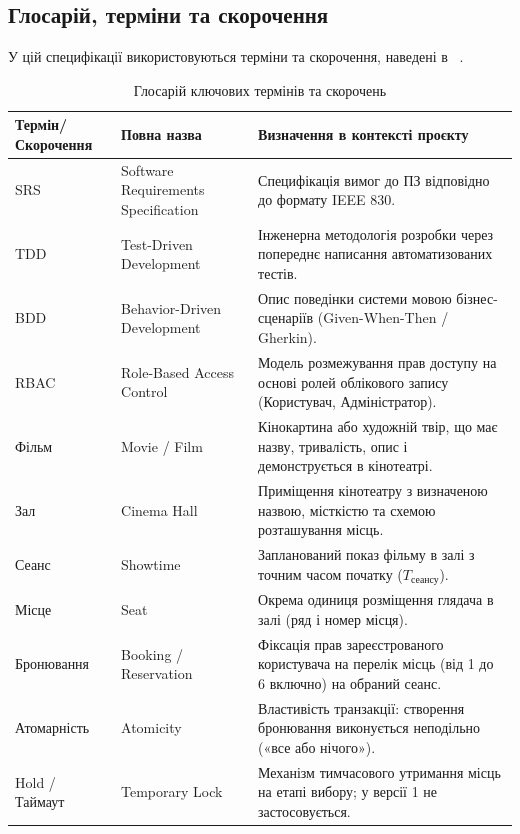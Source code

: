 \subsection{Глосарій, терміни та скорочення}\label{sec:vstup-hlosarii}
У цій специфікації використовуються терміни та скорочення, наведені в ~.

\begin{table}[htbp]
\caption{Глосарій ключових термінів та скорочень}\label{tab:glossary}
\centering
\begin{tabularx}{\textwidth}{@{}l l L@{}}
\toprule
\textbf{Термін/Скорочення} & \textbf{Повна назва} & \textbf{Визначення в контексті проєкту} \\
\midrule
SRS & Software Requirements Specification & Специфікація вимог до ПЗ відповідно до формату IEEE 830. \\
TDD & Test-Driven Development & Інженерна методологія розробки через попереднє написання автоматизованих тестів. \\
BDD & Behavior-Driven Development & Опис поведінки системи мовою бізнес-сценаріїв (Given-When-Then / Gherkin). \\
RBAC & Role-Based Access Control & Модель розмежування прав доступу на основі ролей облікового запису (Користувач, Адміністратор). \\
Фільм & Movie / Film & Кінокартина або художній твір, що має назву, тривалість, опис і демонструється в кінотеатрі. \\
Зал & Cinema Hall & Приміщення кінотеатру з визначеною назвою, місткістю та схемою розташування місць. \\
Сеанс & Showtime & Запланований показ фільму в залі з точним часом початку ($T_{\text{сеансу}}$). \\
Місце & Seat & Окрема одиниця розміщення глядача в залі (ряд і номер місця). \\
Бронювання & Booking / Reservation & Фіксація прав зареєстрованого користувача на перелік місць (від 1 до 6 включно) на обраний сеанс. \\
Атомарність & Atomicity & Властивість транзакції: створення бронювання виконується неподільно («все або нічого»). \\
Hold / Таймаут & Temporary Lock & Механізм тимчасового утримання місць на етапі вибору; у версії 1 не застосовується. \\
\bottomrule
\end{tabularx}
\end{table}

